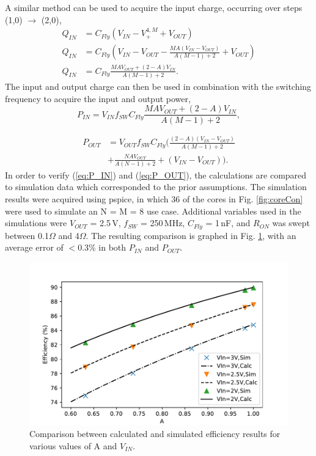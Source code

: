 \documentclass[conference]{IEEEtran}
\begin{document}
 	A similar method can be used to acquire the input charge, occurring over steps (1,0) $\rightarrow$ (2,0),
 	\begin{equation}
 	\begin{split}
 	Q_{IN} &= C_{Fly}\left(V_{IN} - V_+^{4,M} + V_{OUT}\right) \\
 	Q_{IN} &= C_{Fly}\!\left(V_{IN} - V_{OUT} - \tfrac{MA(V_{IN}\! -\!V_{OUT})}{A(M-1) + 2} + V_{OUT}\!\right) \\
 	Q_{IN} &= C_{Fly}\tfrac{MAV_{OUT} + (2-A)V_{IN}}{A(M-1) + 2}.
 	\end{split}
 	\end{equation}
 	The input and output charge can then be used in combination with the switching frequency to acquire the input and output power,
 	\begin{equation}
 	P_{IN} = V_{IN}f_{SW}C_{Fly}\frac{MAV_{OUT} + (2-A)V_{IN}}{A(M-1) + 2},
 	\label{eq:P_IN}
 	\end{equation}
 	
 	\begin{equation}
 	\begin{split}
 	P_{OUT} &= V_{OUT}f_{SW}C_{Fly}\Big(\tfrac{(2-A)(V_{IN} - V_{OUT})}{A(M-1) + 2} \\ 
 	&+ \tfrac{NAV_{OUT}}{A(N-1) + 2} + (V_{IN} - V_{OUT})\Big).
 	\end{split} 	
 	\label{eq:P_OUT}
 	\end{equation}
 	In order to verify (\ref{eq:P_IN}) and (\ref{eq:P_OUT}), the calculations are compared to simulation data which corresponded to the prior assumptions. The simulation results were acquired using pspice, in which 36 of the cores in Fig. \ref{fig:coreCon} were used to simulate an N = M = 8 use case. Additional variables used in the simulations were $V_{OUT}$ = 2.5$\,$V, $f_{SW}$ = 250$\,$MHz, $C_{Fly}$ = 1$\,$nF, and $R_{ON}$ was swept between 0.1$\Omega$ and 4$\Omega$. The resulting comparison is graphed in Fig. \ref{fig:Comp_A}, with an average error of $<$0.3\% in both $P_{IN}$ and $P_{OUT}$.
 	
 	\begin{figure}
 		\centering
 		\includegraphics[width=\linewidth]{Figures/eta_A.pdf}
 		\caption{Comparison between calculated and simulated efficiency results for various values of A and $V_{IN}$.}
 		\label{fig:Comp_A}
 	\end{figure}
\end{document}
